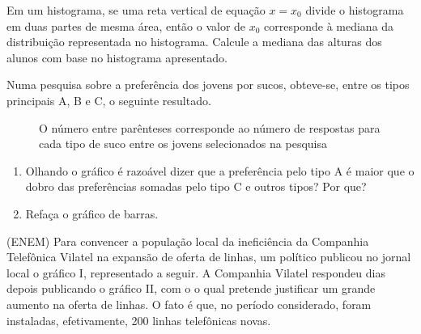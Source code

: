 Em um histograma, se uma reta vertical de equação \(x=x_0\) divide o histograma em duas partes de mesma área, então o valor de \(x_0\) corresponde à mediana da distribuição representada no histograma. Calcule a mediana das alturas dos alunos com base no histograma apresentado.

\clearpage
\item Numa pesquisa sobre a preferência dos jovens por sucos, obteve-se, entre os tipos principais A, B e C, o seguinte resultado.

\begin{figure}[H]
\centering
\capstart


\caption{O número entre parênteses corresponde ao número de respostas para cada tipo de suco entre os jovens selecionados na pesquisa}\label{\detokenize{PE103-E:id11}}\label{\detokenize{PE103-E:id28}}\end{figure}
\begin{enumerate}
\item {} 
Olhando o gráfico é razoável dizer que a preferência pelo tipo A é maior que o dobro das preferências somadas pelo tipo C e outros tipos? Por que?

\item {} 
Refaça o gráfico de barras.

\end{enumerate}

\item (ENEM) Para convencer a população local da ineficiência da Companhia Telefônica Vilatel na expansão de oferta de linhas, um político publicou no jornal local o gráfico I, representado a seguir. A Companhia Vilatel respondeu dias depois publicando o gráfico II, com o o qual pretende justificar um grande aumento na oferta de linhas. O fato é que, no período considerado, foram instaladas, efetivamente, 200 linhas telefônicas novas.

